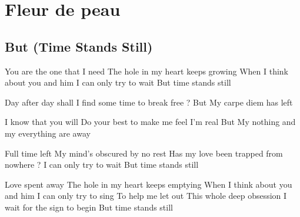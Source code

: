 \documentclass{article}
\newenvironment{album}[1]%
{%
  \section*{#1}
}%
{%
}
\newenvironment{song}[1]%
{%
  \subsection*{\textbf{#1}}
  \begin{multicols*}{2}
}%
{%
  \end{multicols*}
  \newpage
}
\newenvironment{couplet} %
{%
  \verbatim
}%
{% end code
  \endverbatim
}
\newenvironment{refrain} %
{%
  \verbatim
}%
{% end code
  \endverbatim
}
\begin{document}
\begin{album}{Fleur de peau}
\begin{song}{But (Time Stands Still)}
\begin{couplet}
\end{couplet}
\begin{refrain}
You are the one that I need
The hole in my heart keeps growing
When I think about you and him
I can only try to wait
But time stands still
\end{refrain}
\begin{couplet}
Day after day shall I find
some time to break free ?
But
My carpe diem has left
\end{couplet}
\begin{couplet}
I know that you will
Do your best to make me feel I’m real
But
My nothing and my everything are away
\end{couplet}
\begin{refrain}
Full time left
My mind’s obscured by no rest
Has my love been trapped from nowhere ?
I can only try to wait
But time stands still
\end{refrain}
\begin{refrain}
Love spent away
The hole in my heart keeps emptying
When I think about you and him
I can only try to sing
To help me let out
This whole deep obsession
I wait for the sign to begin
But time stands still
\end{refrain}
\end{song}


\end{album}
\end{document}
